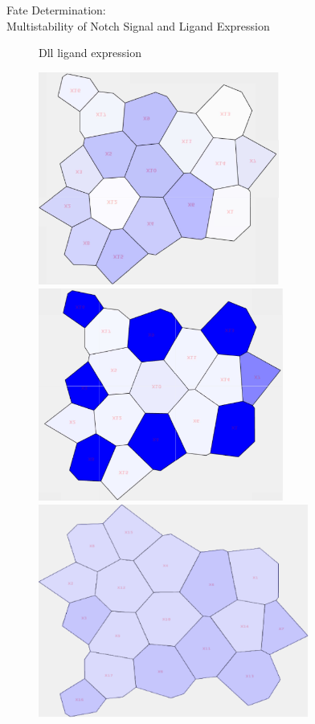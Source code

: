 \documentclass[xelatex]{beamer}
\newlength{\colwidth}
\begin{document}
\begin{frame}[t]
\begin{columns}[t]
\begin{column}{\colwidth}
\begin{alertblock}{Fate Determination: \\ Multistability of Notch Signal and Ligand Expression}
\begin{figure}
\begin{minipage}{0.4\textwidth}
			\caption{Dll ligand expression}
			\label{fig:li_in}
		\end{minipage}
	\end{figure}
		\begin{figure}
	\centering
	\begin{minipage}{0.22\textwidth}
		\includegraphics[height=7cm]{Image/Simulation_Delta_start}
	\end{minipage}
	\begin{minipage}{0.22\textwidth}
		\includegraphics[height=7cm]{Image/Simulation_Delta_end}
	\end{minipage}
	\begin{minipage}{0.22\textwidth}
		\includegraphics[height=7cm]{Image/Simulation_Hes1_start}

\end{minipage}
\end{figure}
\end{alertblock}
\end{column}
\end{columns}
\end{frame}
\end{document}
